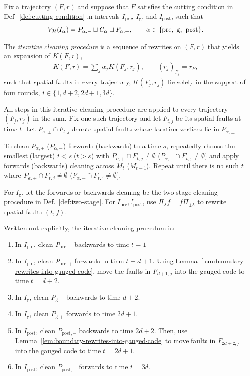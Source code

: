 \documentclass[11pt]{article}
\begin{document}
\begin{definition}
\label{def:iter-cleaning}
Fix a trajectory $(F,r)$ and suppose that $F$ satisfies the cutting condition in Def.~\ref{def:cutting-condition} in intervals $I_\mathrm{pre}$, $I_\mathrm{g}$, and $I_\mathrm{post}$, such that 
\[
V_\cH (I_\alpha) = P_{\alpha,-} \sqcup C_\alpha \sqcup P_{\alpha,+},\qquad \alpha\in \{\mathrm{pre,\ g,\ post}\}.
\]


The \emph{iterative cleaning procedure} is a sequence of rewrites on $(F,r)$ that yields an expansion of $K(F,r)$,
\begin{align}
    K(F,r) = \sum_{j}\alpha_j K(F_j,r_j),\qquad (r_j)_{F_j}=r_F,
\end{align}
such that spatial faults in every trajectory, $K(F_j,r_j)$ lie solely in the support of four rounds, $t\in \{1,d+2,2d+1,3d\}$.


All steps in this iterative cleaning procedure are applied to every trajectory $(F_{j},r_j)$ in the sum.
Fix one such trajectory and let $F_{t,j}$ be its spatial faults at time $t$. Let $P_{\alpha,\pm }\cap F_{t,j}$ denote spatial faults whose location vertices lie in $P_{\alpha,\pm}$.

To clean $P_{\alpha,+}$ ($P_{\alpha,-}$) forwards (backwards) to a time $s$, repeatedly choose the smallest (largest) $t<s$ ($t>s$) with $P_{\alpha,+}\cap F_{t,j}\neq \emptyset$ ($P_{\alpha,-}\cap F_{t,j}\neq \emptyset$) and apply forwards (backwards) cleaning across $M_{t}$ ($M_{t-1}$). Repeat until there is no such $t$ where $P_{\alpha,+}\cap F_{t,j}\neq \emptyset$ ($P_{\alpha,-}\cap F_{t,j}\neq \emptyset$).

For $I_{\mathrm{g}}$, let the forwards or backwards cleaning be the two-stage cleaning procedure in Def.~\ref{def:two-stage}.
For $I_{\mathrm{pre}}, I_{\mathrm{post}}$, use $\Pi_{\lambda}f  = f\Pi_{\pm\lambda}$ to rewrite spatial faults $(t,f)$.

\end{definition}

Written out explicitly, the iterative cleaning procedure is:
\begin{enumerate}
    \item In $I_\mathrm{pre}$, clean $P_{\text{pre},-}$ backwards to time $t=1$.
    \item In $I_\mathrm{pre}$, clean $P_{\text{pre},+}$ forwards to time $t=d+1$.
    Using Lemma~\ref{lem:boundary-rewrites-into-gauged-code}, move the faults in $F_{d+1,j}$ into the gauged code to time $t=d+2$.
    \item In $I_\mathrm{g}$, clean $P_{\mathrm{g},-}$ backwards to time $d+2$.
    \item In $I_\mathrm{g}$, clean $P_{\mathrm{g},+}$ forwards to time $2d+1$.
    \item In $I_{\mathrm{post}}$, clean $P_{\mathrm{post},-}$ backwards to time $2d+2$. Then, use Lemma~\ref{lem:boundary-rewrites-into-gauged-code} to move faults in $F_{2d+2,j}$ into the gauged code to time $t=2d+1$.
    \item In $I_{\mathrm{post}}$, clean $P_{\mathrm{post},+}$ forwards to time $t=3d$.
\end{enumerate}
\end{document}
